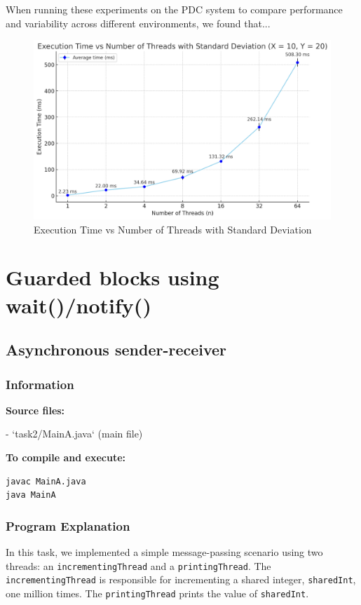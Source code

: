\documentclass{article}
\begin{document}
When running these experiments on the PDC system to compare performance and variability across different environments, we found that...

\begin{figure}[h]
    \centering
    \includegraphics[width=1\linewidth]{LaTex/images/Execution Time vs Number of Threads with Standard Deviation (X = 10, Y = 20).png}
    \caption{Execution Time vs Number of Threads with Standard Deviation}
    \label{fig:1.31}
\end{figure}




\newpage
\section{Guarded blocks using wait()/notify()}


\subsection{Asynchronous sender-receiver}

\subsubsection{Information}
\textbf{Source files:}

- `task2/MainA.java` (main file)

\textbf{To compile and execute:}
\begin{lstlisting}[style=bash]
javac MainA.java
java MainA
\end{lstlisting}

\subsubsection{Program Explanation}
In this task, we implemented a simple message-passing scenario using two threads: an \texttt{incrementingThread} and a \texttt{printingThread}. The \texttt{incrementingThread} is responsible for incrementing a shared integer, \texttt{sharedInt}, one million times. The \texttt{printingThread} prints the value of \texttt{sharedInt}.
\end{document}
